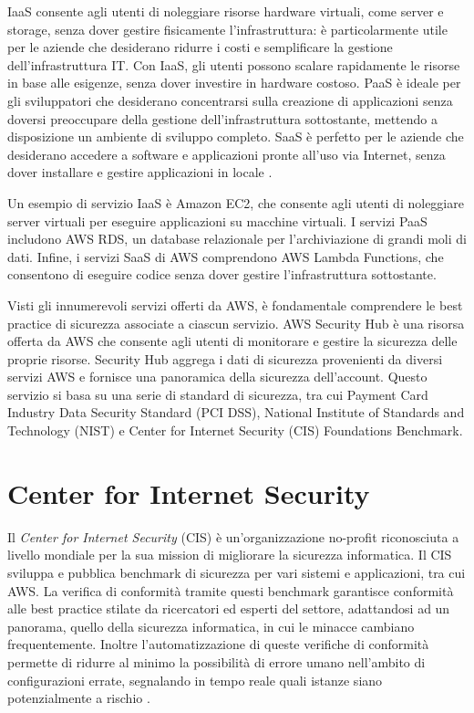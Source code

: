 IaaS consente agli utenti di noleggiare risorse hardware virtuali, come server e storage, senza dover gestire fisicamente l'infrastruttura: è particolarmente utile per le aziende che desiderano ridurre i costi e semplificare la gestione dell'infrastruttura IT. Con IaaS, gli utenti possono scalare rapidamente le risorse in base alle esigenze, senza dover investire in hardware costoso. PaaS è ideale per gli sviluppatori che desiderano concentrarsi sulla creazione di applicazioni senza doversi preoccupare della gestione dell'infrastruttura sottostante, mettendo a disposizione un ambiente di sviluppo completo. SaaS è perfetto per le aziende che desiderano accedere a software e applicazioni pronte all'uso via Internet, senza dover installare e gestire applicazioni in locale \cite{10823401}.

Un esempio di servizio IaaS è Amazon EC2, che consente agli utenti di noleggiare server virtuali per eseguire applicazioni su macchine virtuali. I servizi PaaS includono AWS RDS, un database relazionale per l'archiviazione di grandi moli di dati. Infine, i servizi SaaS di AWS comprendono AWS Lambda Functions, che consentono di eseguire codice senza dover gestire l'infrastruttura sottostante.

Visti gli innumerevoli servizi offerti da AWS, è fondamentale comprendere le best practice di sicurezza associate a ciascun servizio. AWS Security Hub è una risorsa offerta da AWS che consente agli utenti di monitorare e gestire la sicurezza delle proprie risorse. Security Hub aggrega i dati di sicurezza provenienti da diversi servizi AWS e fornisce una panoramica della sicurezza dell'account. Questo servizio si basa su una serie di standard di sicurezza, tra cui Payment Card Industry Data Security Standard (PCI DSS), National Institute of Standards and Technology (NIST) e Center for Internet Security (CIS) Foundations Benchmark.

\section{Center for Internet Security}
\label{sec:cis}

Il \textit{Center for Internet Security} (CIS) è un'organizzazione no-profit riconosciuta a livello mondiale per la sua mission di migliorare la sicurezza informatica. Il CIS sviluppa e pubblica benchmark di sicurezza per vari sistemi e applicazioni, tra cui AWS. La verifica di conformità tramite questi benchmark garantisce conformità alle best practice stilate da ricercatori ed esperti del settore, adattandosi ad un panorama, quello della sicurezza informatica, in cui le minacce cambiano frequentemente. Inoltre l'automatizzazione di queste verifiche di conformità permette di ridurre al minimo la possibilità di errore umano nell'ambito di configurazioni errate, segnalando in tempo reale quali istanze siano potenzialmente a rischio \cite{10602274}.

